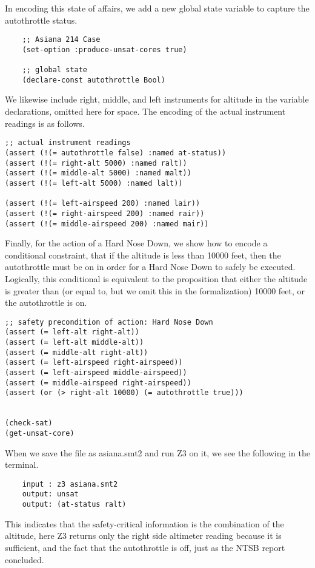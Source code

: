 In encoding this state of affairs, we add a new global state variable to capture the autothrottle status.
\noindent
\begin{tcolorbox}
	\begin{lstlisting}
	;; Asiana 214 Case
	(set-option :produce-unsat-cores true)
	
	;; global state
	(declare-const autothrottle Bool)
	\end{lstlisting}
\end{tcolorbox}
\noindent
We likewise include right, middle, and left instruments for altitude in the variable declarations, omitted here for space. The encoding of the actual instrument readings is as follows.
\noindent
\begin{tcolorbox}
	\begin{lstlisting}
;; actual instrument readings
(assert (!(= autothrottle false) :named at-status))
(assert (!(= right-alt 5000) :named ralt))
(assert (!(= middle-alt 5000) :named malt))
(assert (!(= left-alt 5000) :named lalt))

(assert (!(= left-airspeed 200) :named lair))
(assert (!(= right-airspeed 200) :named rair))
(assert (!(= middle-airspeed 200) :named mair))
	\end{lstlisting}
\end{tcolorbox}
\noindent
Finally, for the action of a Hard Nose Down, we show how to encode a conditional constraint, that if the altitude is less than 10000 feet, then the autothrottle must be on in order for a Hard Nose Down to safely be executed. Logically, this conditional is equivalent to the proposition that either the altitude is greater than (or equal to, but we omit this in the formalization) 10000 feet, or the autothrottle is on.
\noindent
\begin{tcolorbox}
	\begin{lstlisting}
;; safety precondition of action: Hard Nose Down
(assert (= left-alt right-alt))
(assert (= left-alt middle-alt))
(assert (= middle-alt right-alt))
(assert (= left-airspeed right-airspeed))
(assert (= left-airspeed middle-airspeed))
(assert (= middle-airspeed right-airspeed))
(assert (or (> right-alt 10000) (= autothrottle true)))


(check-sat)
(get-unsat-core)
	\end{lstlisting}
\end{tcolorbox}
\noindent
When we save the file as asiana.smt2 and run Z3 on it, we see the following in the terminal.
\noindent
\begin{tcolorbox}
	\begin{lstlisting}
	input : z3 asiana.smt2
	output: unsat
	output: (at-status ralt)
	\end{lstlisting}
\end{tcolorbox}
\noindent
This indicates that the safety-critical information is the combination of the altitude, here Z3 returns only the right side altimeter reading because it is sufficient, and the fact that the autothrottle is off, just as the NTSB report concluded.

